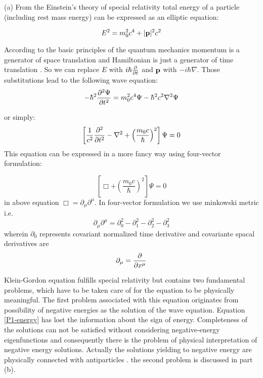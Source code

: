 \begin{homeworkProblem}



\begin{homeworkSection}{(a)} 
From the  Einstein's theory of special relativity total energy of a particle (including rest mass energy) can be expressed as an elliptic  equation:

\begin{equation}\label{P1-energy}
E^2=m_0^2c^4+\lvert\mathbf{p}\rvert^2c^2
\end{equation}


According to the basic principles of the quantum mechanics momentum is a generator of space translation and Hamiltonian  is just a generator of time translation \cite{sakurai}. So  we can replace $E$ with $i\hbar\frac{\partial}{\partial t}$  and $\mathbf{p}$ with $-i\hbar\nabla$. Those substitutions lead to the following wave equation:
\begin{equation}
-\hbar^2\dfrac{\partial^2 {\Psi}}{\partial {t}^2}=m_0^2c^4\Psi-\hbar^2c^2\nabla^2\Psi
\end{equation}

or simply:
\begin{equation}
\left[\frac{1}{c^2}\dfrac{\partial^2}{\partial {t}^2}-\nabla^2+\left(\frac{m_0c}{\hbar}\right)^2\right]\Psi=0
\end{equation}
This equation can be expressed in a more fancy way using four-vector formulation:

\begin{equation}\label{P1-waveequation}
\left[\Box+\left(\frac{m_0c}{\hbar}\right)^2\right]\Psi=0
\end{equation}
in above equation
$\Box=\partial_\mu\partial^{\mu}$. In four-vector formulation we use minkowski metric i.e. 
$$\partial_\mu\partial^{\mu}=\partial_0^2-\partial_1^2-\partial_2^2-\partial_3^2$$
wherein $\partial_0 $ represents covariant normalized time derivative and covariante spacal derivatives are $$\partial_{\mu}=\frac{\partial}{\partial x^{\mu}}$$ 

Klein-Gordon equation fulfills special relativity but contains two fundamental problems, which have to be taken care of for the equation to be physically meaningful. The first problem associated with this equation originates from possibility of negative energies as the solution of the wave equation. Equation \eqref{P1-energy} has lost the information about the sign of energy. Completeness of the solutions can not be satisfied without considering negative-energy eigenfunctions and consequently there is the problem of physical interpretation of negative energy solutions. Actually the solutions yielding to negative energy are physically connected with antiparticles \cite{greiner-relativistic_QM}. the second problem is discussed in part (b).


\end{homeworkSection}
\end{homeworkProblem}
